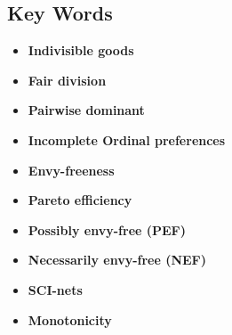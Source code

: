 \documentclass[12pt,a4paper]{article}
\begin{document}
\subsection*{Key Words}
\begin{itemize}
    \item \textbf{Indivisible goods}
    \item \textbf{Fair division}
    \item \textbf{Pairwise dominant}
    \item \textbf{Incomplete Ordinal preferences}
    \item \textbf{Envy-freeness}
    \item \textbf{Pareto efficiency}
    \item \textbf{Possibly envy-free (PEF)}
    \item \textbf{Necessarily envy-free (NEF)}
    \item \textbf{SCI-nets}
    \item \textbf{Monotonicity}
\end{itemize}
\end{document}
